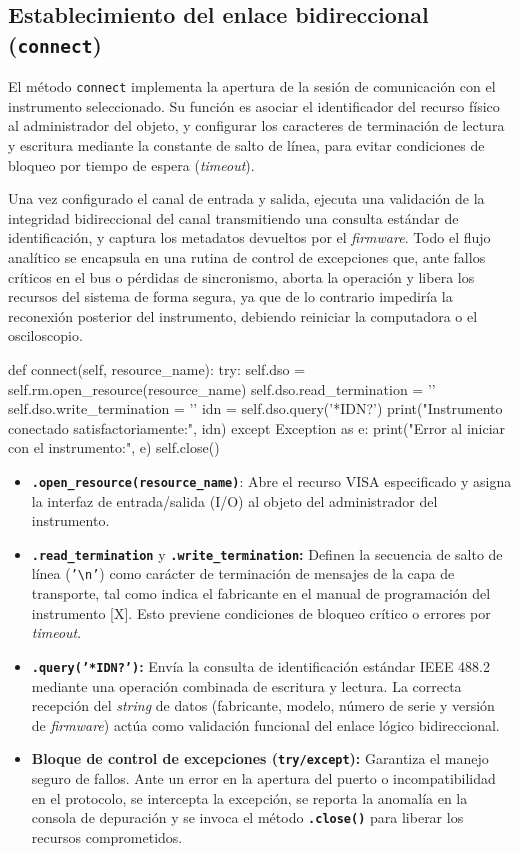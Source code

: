 \subsection{Establecimiento del enlace bidireccional (\texttt{connect})}
El método \texttt{connect} implementa la apertura de la sesión de comunicación con el instrumento seleccionado. Su función es asociar el identificador del recurso físico al administrador del objeto, y configurar los caracteres de terminación de lectura y escritura mediante la constante de salto de línea, para evitar condiciones de bloqueo por tiempo de espera (\textit{timeout}).\par
Una vez configurado el canal de entrada y salida, ejecuta una validación de la integridad bidireccional del canal transmitiendo una consulta estándar de identificación, y captura los metadatos devueltos por el \textit{firmware}. Todo el flujo analítico se encapsula en una rutina de control de excepciones que, ante fallos críticos en el bus o pérdidas de sincronismo, aborta la operación y libera los recursos del sistema de forma segura, ya que de lo contrario impediría la reconexión posterior del instrumento, debiendo reiniciar la computadora o el osciloscopio.

\begin{python}
def connect(self, resource_name):
    try:
        self.dso = self.rm.open_resource(resource_name)
        self.dso.read_termination = '\n'
        self.dso.write_termination = '\n'
        idn = self.dso.query('*IDN?')
        print("Instrumento conectado satisfactoriamente:", idn)
    except Exception as e:
        print("Error al iniciar con el instrumento:", e)
        self.close()
\end{python}

\begin{itemize}
    \item \textbf{\texttt{.open\_resource(resource\_name)}}: Abre el recurso VISA especificado y asigna la interfaz de entrada/salida (I/O) al objeto del administrador del instrumento.
    \item \textbf{\texttt{.read\_termination}} y \textbf{\texttt{.write\_termination}:} Definen la secuencia de salto de línea (\texttt{'\textbackslash n'}) como carácter de terminación de mensajes de la capa de transporte, tal como indica el fabricante en el manual de programación del instrumento [X]. Esto previene condiciones de bloqueo crítico o errores por \textit{timeout}.
    \item \textbf{\texttt{.query('*IDN?')}:} Envía la consulta de identificación estándar IEEE 488.2 mediante una operación combinada de escritura y lectura. La correcta recepción del \textit{string} de datos (fabricante, modelo, número de serie y versión de \textit{firmware}) actúa como validación funcional del enlace lógico bidireccional.
    \item \textbf{Bloque de control de excepciones (\texttt{try/except}):} Garantiza el manejo seguro de fallos. Ante un error en la apertura del puerto o incompatibilidad en el protocolo, se intercepta la excepción, se reporta la anomalía en la consola de depuración y se invoca el método \textbf{\texttt{.close()}} para liberar los recursos comprometidos.
\end{itemize}

